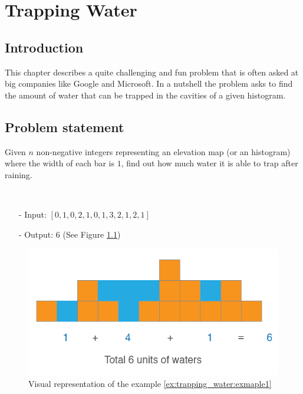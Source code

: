 %

\chapter{Trapping Water}
\label{ch:trapping_water}
\section*{Introduction}
This chapter describes a quite challenging and fun problem that is often asked at big companies like Google and Microsoft. 
In a nutshell the problem asks to find the amount of water that can be trapped in the cavities of a given histogram.


\section{Problem statement}
\begin{exercise}
Given $n$ non-negative integers representing an elevation map (or an histogram) where the width of each bar is $1$, find out how much water it is able to trap after raining.
\end{exercise}


\begin{example}
\label{ex:trapping_water:exmaple1}
	\hfill \\
	\begin{itemize}
		\item[-] Input: $[0,1,0,2,1,0,1,3,2,1,2,1]$
		\item[-] Output: $6$ (See Figure \ref{fig:trapping_water_example1})
	\end{itemize}

	\begin{figure}
		\label{fig:trapping_water_example1}
		\centering
		\includegraphics[scale=0.5]{sources/trapping_water/images/example1}
		\caption{Visual representation of the example \ref{ex:trapping_water:exmaple1}}
\end{figure}
\end{example}

